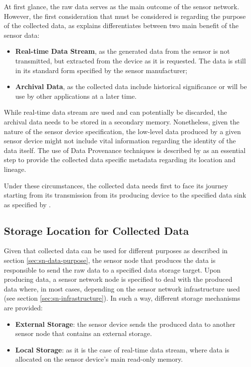 At first glance, the raw data serves as the main outcome of the sensor network.
However, the first consideration that must be considered is regarding the
purpose of the collected data, as \cite{sn-provenance} explains differentiates
between two main benefit of the sensor data:

\begin{itemize}
  \item \textbf{Real-time Data Stream}, as the generated data from the sensor
  is not transmitted, but extracted from the device as it is requested. The
  data is still in its standard form specified by the sensor manufacturer;
  \item \textbf{Archival Data}, as the collected data include historical
  significance or will be use by other applications at a later time.
\end{itemize}

While real-time data stream are used and can potentially be discarded, the
archival data needs to be stored in a secondary memory. Nonetheless, given the
nature of the sensor device specification, the low-level data produced by a
given sensor device might not include vital information regarding the identity
of the data itself. The use of Data Provenance techniques is described by
\cite{sn-provenance} as an essential step to provide the collected data
specific metadata regarding its location and lineage.

Under these circumstances, the collected data needs first to face its journey
starting from its transmission from its producing device to the specified data
sink as specified by \cite{sn-storage01, sn-storage02, sn-storage03}.

\subsection{Storage Location for Collected Data}
\label{sec:sn-storage-locations}

Given that collected data can be used for different purposes as described in
section \ref{sec:sn-data-purpose}, the sensor node that produces the data is
responsible to send the raw data to a specified data storage target. Upon
producing data, a sensor network node is specified to deal with the produced
data where, in most cases, depending on the sensor network infrastructure used
\cite{sn-storage03} (see section \ref{sec:sn-infrastructure}). In such a way,
different storage mechanisms are provided:

\begin{itemize}
  \item \textbf{External Storage}: the sensor device sends the produced data to
  another sensor node that contains an external storage.
  \item \textbf{Local Storage}: as it is the case of real-time data stream,
  where data is allocated on the sensor device's main read-only memory.
\end{itemize}

